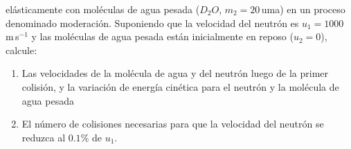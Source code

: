 \documentclass[a4paper,12pt]{article}
\begin{document}
\begin{enumerate}
		elásticamente con moléculas de agua pesada ($D_2O$, $m_2=20$\,uma) en
		un proceso denominado moderación. Suponiendo que la velocidad del
		neutrón es $u_1=1000$\,m\,s$^{-1}$ y las moléculas de agua pesada están
		inicialmente en reposo ($u_2=0$), calcule:
		\begin{enumerate}
			\item Las velocidades de la molécula de agua y del neutrón luego de
				la primer colisión, y la variación de energía cinética para el
				neutrón y la molécula de agua pesada
			\item El número de colisiones necesarias para que la velocidad del
				neutrón se reduzca al $0.1\%$ de $u_1$.
		\end{enumerate}
\end{enumerate}
\end{document}
